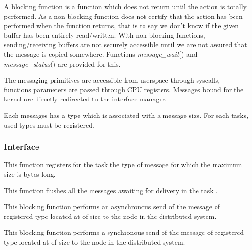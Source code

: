 A blocking function is a function which does not return until the
action is totally performed. As a non-blocking function does not certify
that the action has been performed when the function returns, that is to
say we don't know if the given buffer has been entirely read/written. With
non-blocking functions, sending/receiving buffers are not securely accessible
until we are not assured that the message is copied somewhere. Functions
\textit{message\_wait}() and \textit{message\_status}() are provided for
this.

The messaging primitives are accessible from userspace through syscalls,
functions parameters are passed through CPU registers. Messages bound for
the kernel are directly redirected to the interface manager.

Each messages has a type which is associated with a message size. For each
tasks, used types must be registered.


%
%

\subsubsection{Interface}

	 {
	   This function registers for the task  the type
	   of message  for which the maximum size is
	    bytes long.
	 }

	 {
	   This function flushes all the messages awaiting for delivery
	   in the task .
	 }

	 {
	   This blocking function performs an asynchronous send of the
	   message of registered type  located at
	    of size  to the node
	    in the distributed system.
	 }

	 {
	   This blocking function performs a synchronous send of the
	   message of registered type  located at
	    of size  to the node
	    in the distributed system.
	 }

